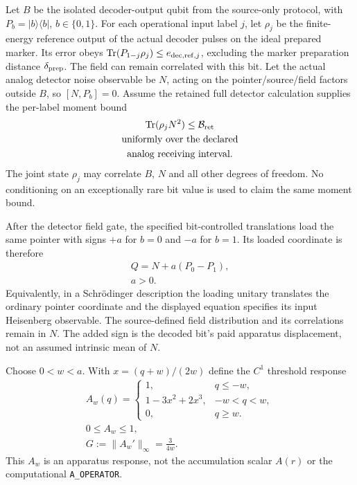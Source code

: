 Let $B$ be the isolated decoder-output qubit from the source-only protocol,
with $P_b=|b\rangle\langle b|$, $b\in\{0,1\}$. For each operational input
label $j$, let $\rho_j$ be the finite-energy reference output of the actual
decoder pulses on the ideal prepared marker. Its error obeys
$\operatorname{Tr}(P_{1-j}\rho_j)\leq e_{{\rm dec,ref},j}$, excluding
the marker preparation distance $\delta_{\rm prep}$. The field can remain
correlated with this bit. Let the actual analog detector noise observable be
$N$, acting on the pointer/source/field factors outside $B$, so
$[N,P_b]=0$. Assume the retained full detector calculation supplies the
per-label moment bound
\begin{equation}\begin{gathered}
\operatorname{Tr}(\rho_jN^2)\leq\mathcal B_{\rm ret}
 \\
\text{uniformly over the declared}\\\text{analog receiving interval.}
\label{eq:chvi-memory-noise-input}
\end{gathered}\end{equation}
The joint state $\rho_j$ may correlate $B$, $N$ and all other degrees of
freedom. No conditioning on an exceptionally rare bit value is used to
claim the same moment bound.

After the detector field gate, the specified bit-controlled translations
load the same pointer with signs $+a$ for $b=0$ and $-a$ for $b=1$.
Its loaded coordinate is therefore
\begin{equation}
\begin{gathered}
Q=N+a(P_0-P_1),\\
 a>0.
\end{gathered}
\label{eq:chvi-memory-loaded-coordinate}
\end{equation}
Equivalently, in a Schr\"odinger description the loading unitary translates
the ordinary pointer coordinate and the displayed equation specifies its
input Heisenberg observable. The source-defined field distribution and its
correlations remain in $N$. The added sign is the decoded bit's paid
apparatus displacement, not an assumed intrinsic mean of $N$.

Choose $0<w<a$. With $x=(q+w)/(2w)$ define the $C^1$ threshold response
\begin{equation}
\begin{gathered}
A_w(q)=
 \begin{cases}
 1,&q\leq-w,\\
 1-3x^2+2x^3,&-w<q<w,\\
 0,&q\geq w.
 \end{cases}
 \\
 0\leq A_w\leq1,
 \\
 G:=\|A_w'\|_\infty=\frac{3}{4w}.
\end{gathered}
\label{eq:chvi-memory-threshold}
\end{equation}
This $A_w$ is an apparatus response, not the accumulation scalar $A(r)$
or the computational \texttt{A\_OPERATOR}.


